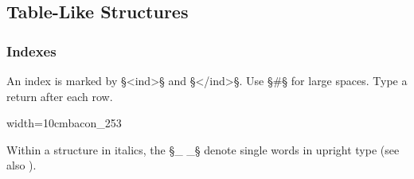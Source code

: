 \subsection{Table-Like Structures}
\label{section table-like structures}

\subsubsection{Indexes}
\label{section indexes}

\begin{mainrule}
An index is marked by §<ind>§ and §</ind>§. Use §#§ for large spaces. Type a return after each row. 
\end{mainrule}



\begin{sampleImageSmall}[1]{width=10cm}{bacon_253}

\end{sampleImageSmall}

\begin{crossref}
Within a structure in italics, the §_ _§ denote single words in upright type (see also ).
\end{crossref}

